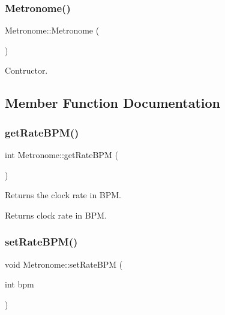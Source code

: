 \subsubsection{\texorpdfstring{Metronome()}{Metronome()}}
{\footnotesize\ttfamily Metronome\+::\+Metronome (\begin{DoxyParamCaption}{ }\end{DoxyParamCaption})}

Contructor. 

\subsection{Member Function Documentation}
\mbox{\label{classdrumpi_1_1clock_1_1Metronome_acd480d4bfe6d10a1990f9cac7578f071}} 
\subsubsection{\texorpdfstring{get\+Rate\+B\+P\+M()}{getRateBPM()}}
{\footnotesize\ttfamily int Metronome\+::get\+Rate\+B\+PM (\begin{DoxyParamCaption}{ }\end{DoxyParamCaption})}

Returns the clock rate in B\+PM. \begin{DoxyReturn}{Returns}
clock rate in B\+PM. 
\end{DoxyReturn}
\mbox{\label{classdrumpi_1_1clock_1_1Metronome_a831ff1dbeabee49fb64e468f4ecddaf0}} 
\subsubsection{\texorpdfstring{set\+Rate\+B\+P\+M()}{setRateBPM()}}
{\footnotesize\ttfamily void Metronome\+::set\+Rate\+B\+PM (\begin{DoxyParamCaption}\item[{int}]{bpm }\end{DoxyParamCaption})}

